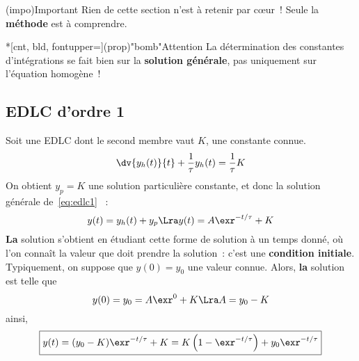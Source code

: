 \documentclass[a4paper, 11pt, garamond]{book}
\begin{document}
\begin{tcn}[cnt](impo){Important}
	Rien de cette section n'est à retenir par cœur~! Seule la \textbf{méthode} est
	à comprendre.
\end{tcn}
\begin{tcn}*[cnt, bld, fontupper=\Large](prop)"bomb"{Attention}
	La détermination des constantes d'intégrations se fait bien sur la
	\textbf{solution générale}, pas uniquement sur l'équation homogène~!
\end{tcn}

\subsection{EDLC d'ordre 1}
Soit une EDLC dont le second membre vaut $K$, une constante connue.
\begin{equation}
	\dv{y_h(t)}{t} + \frac{1}{\tau} y_h(t) = \frac{1}{\tau}K
	\label{eq:edlc1}
\end{equation}
On obtient $y_p = K$ une solution particulière constante, et donc la solution
générale de~\eqref{eq:edlc1} ~:
\[
	y(t) = y_h(t) + y_p
	\Lra
	y(t) = A\exr^{-t/\tau} + K
\]
\textbf{La} solution s'obtient en étudiant cette forme de solution à un temps
donné, où l'on connaît la valeur que doit prendre la solution~: c'est une
\textbf{condition initiale}. Typiquement, on suppose que $y(0) = y_0$ une valeur
connue. Alors, \textbf{la} solution est telle que
\[
	y(0) = y_0 = A\exr^{0} + K
	\Lra
	A = y_0 - K
\]
ainsi,
\[
	\boxed{
		y(t) =
		(y_0-K)\exr^{-t/\tau}+K =
		K\left(1-\exr^{-t/\tau}\right)+y_0 \exr^{-t/\tau}}
\]
\end{document}
